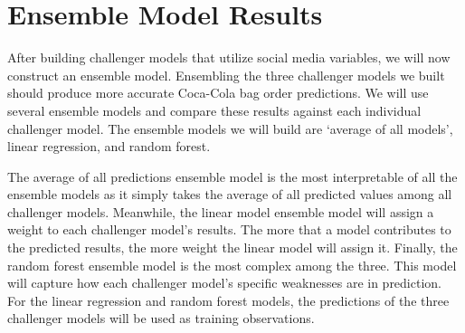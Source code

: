 \documentclass[12pt,oneside]{chicagocapstone}
\begin{document}
\section*{Ensemble Model Results}\label{ensemble-model-results}

After building challenger models that utilize social media variables, we
will now construct an ensemble model. Ensembling the three challenger
models we built should produce more accurate Coca-Cola bag order
predictions. We will use several ensemble models and compare these
results against each individual challenger model. The ensemble models we
will build are `average of all models', linear regression, and random
forest.

The average of all predictions ensemble model is the most interpretable
of all the ensemble models as it simply takes the average of all
predicted values among all challenger models. Meanwhile, the linear
model ensemble model will assign a weight to each challenger model's
results. The more that a model contributes to the predicted results, the
more weight the linear model will assign it. Finally, the random forest
ensemble model is the most complex among the three. This model will
capture how each challenger model's specific weaknesses are in
prediction. For the linear regression and random forest models, the
predictions of the three challenger models will be used as training
observations.
\end{document}
